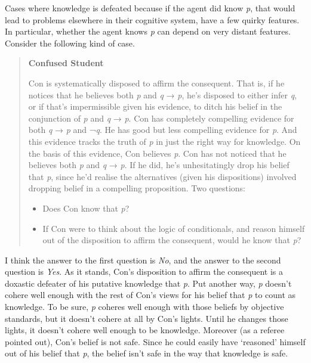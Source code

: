 \documentclass[
  10pt,
  letterpaper,
  DIV=11,
  numbers=noendperiod,
  twoside]{scrartcl}
\begin{document}
Cases where knowledge is defeated because if the agent did know
\emph{p}, that would lead to problems elsewhere in their cognitive
system, have a few quirky features. In particular, whether the agent
knows \emph{p} can depend on very distant features. Consider the
following kind of case.

\begin{quote}
\textbf{Confused Student}

Con is systematically disposed to affirm the consequent. That is, if he
notices that he believes both \emph{p} and \emph{q} → \emph{p}, he's
disposed to either infer \emph{q}, or if that's impermissible given his
evidence, to ditch his belief in the conjunction of \emph{p} and
\emph{q} → \emph{p}. Con has completely compelling evidence for both
\emph{q} → \emph{p} and ¬\emph{q}. He has good but less compelling
evidence for \emph{p}. And this evidence tracks the truth of \emph{p} in
just the right way for knowledge. On the basis of this evidence, Con
believes \emph{p}. Con has not noticed that he believes both \emph{p}
and \emph{q} → \emph{p}. If he did, he's unhesitatingly drop his belief
that \emph{p}, since he'd realise the alternatives (given his
dispositions) involved dropping belief in a compelling proposition. Two
questions:

\begin{itemize}
\item
  Does Con know that \emph{p}?
\item
  If Con were to think about the logic of conditionals, and reason
  himself out of the disposition to affirm the consequent, would he know
  that \emph{p}?
\end{itemize}
\end{quote}

I think the answer to the first question is \emph{No}, and the answer to
the second question is \emph{Yes}. As it stands, Con's disposition to
affirm the consequent is a doxastic defeater of his putative knowledge
that \emph{p}. Put another way, \emph{p} doesn't cohere well enough with
the rest of Con's views for his belief that \emph{p} to count as
knowledge. To be sure, \emph{p} coheres well enough with those beliefs
by objective standards, but it doesn't cohere at all by Con's lights.
Until he changes those lights, it doesn't cohere well enough to be
knowledge. Moreover (as a referee pointed out), Con's belief is not
safe. Since he could easily have `reasoned' himself out of his belief
that \emph{p}, the belief isn't safe in the way that knowledge is safe.
\end{document}
